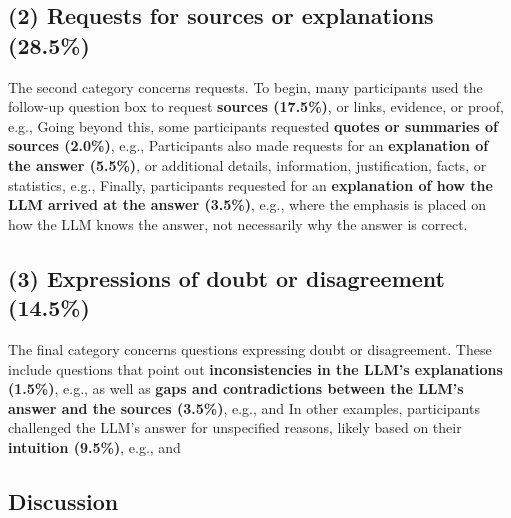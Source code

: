 \subsection*{(2) Requests for sources or explanations (28.5\%)}

The second category concerns requests.
To begin, many participants used the follow-up question box to request \textbf{sources (17.5\%)}, or links, evidence, or proof, e.g., 
Going beyond this, some participants requested \textbf{quotes or summaries of sources (2.0\%)}, e.g., 
Participants also made requests for an \textbf{explanation of the answer (5.5\%)}, or additional details, information, justification, facts, or statistics, e.g., 
Finally, participants requested for an \textbf{explanation of how the LLM arrived at the answer (3.5\%)}, e.g.,  where the emphasis is placed on how the LLM knows the answer, not necessarily why the answer is correct. 



\subsection*{(3) Expressions of doubt or disagreement (14.5\%)}

The final category concerns questions expressing doubt or disagreement.
These include questions that point out \textbf{inconsistencies in the LLM's explanations (1.5\%)}, e.g.,  as well as \textbf{gaps and contradictions between the LLM's answer and the sources (3.5\%)}, e.g.,  and 
In other examples, participants challenged the LLM's answer for unspecified reasons, likely based on their \textbf{intuition (9.5\%)}, e.g.,  and  



\subsection*{Discussion}

